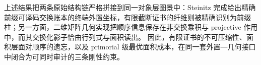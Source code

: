 \noindent
上述结果把两条原始结构链严格拼接到同一对象层图景中：Steinitz 完成给出精确前缀可译码交换账本的终端外置坐标，有限截断证书的纤维则被精确识别为前缀柱；另一方面，二维矩阵几何实现把顺序信息保存在非交换乘积与 projective 作用中，而其交换化影子恰由行列式与面积读出。
因此，有限证书的不可压缩性、面积层面对顺序的遗忘，以及 primorial 级最优面积成本，在同一套外置—几何接口中闭合为可同时审计的三条刚性约束。

\endinput
